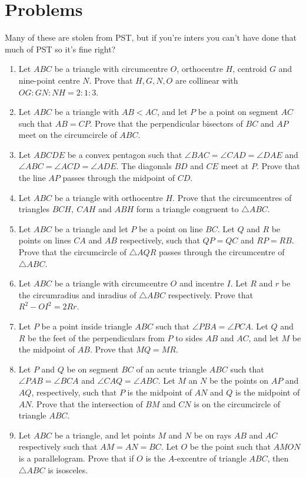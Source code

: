 \documentclass{article}
\begin{document}
\section{Problems}
Many of these are stolen from PST, but if you're inters you can't have done
that much of PST so it's fine right?
\begin{enumerate}
  \item Let $ABC$ be a triangle with circumcentre $O$, orthocentre $H$, centroid
    $G$ and nine-point centre $N$. Prove that $H,G,N,O$ are collinear with
    $OG:GN:NH=2:1:3$.
  \item Let $ABC$ be a triangle with $AB<AC$, and let $P$ be a point on segment
    $AC$ such that $AB=CP$. Prove that the perpendicular bisectors of $BC$ and
    $AP$ meet on the circumcircle of $ABC$.
  \item Let $ABCDE$ be a convex pentagon such that $\angle BAC=\angle CAD=\angle
    DAE$ and $\angle ABC=\angle ACD=\angle ADE$. The diagonals $BD$ and $CE$
    meet at $P$. Prove that the line $AP$ passes through the midpoint of $CD$.
  \item Let $ABC$ be a triangle with orthocentre $H$. Prove that the
    circumcentres of triangles $BCH,\ CAH$ and $ABH$ form a triangle congruent
    to $\triangle ABC$.
  \item Let $ABC$ be a triangle and let $P$ be a point on line $BC$. Let $Q$ and
    $R$ be points on lines $CA$ and $AB$ respectively, such that $QP=QC$ and
    $RP=RB$. Prove that the circumcircle of $\triangle AQR$ passes through the
    circumcentre of $\triangle ABC$.
  \item Let $ABC$ be a triangle with circumcentre $O$ and incentre $I$. Let $R$
    and $r$ be the circumradius and inradius of $\triangle ABC$ respectively. Prove that $R^2-OI^2=2Rr$.
  \item Let $P$ be a point inside triangle $ABC$ such that $\angle PBA=\angle
    PCA$. Let $Q$ and $R$ be the feet of
    the perpendiculars from $P$ to sides $AB$ and $AC$, and let $M$ be the
    midpoint of $AB$. Prove that $MQ=MR$.
  \item Let $P$ and $Q$ be on segment $BC$ of an acute triangle $ABC$ such that
    $\angle PAB=\angle BCA$ and $\angle CAQ=\angle ABC$. Let $M$ an $N$ be the
    points on $AP$ and $AQ$, respectively, such that $P$ is the midpoint of $AN$
    and $Q$ is the midpoint of $AN$. Prove that the intersection of $BM$ and
    $CN$ is on the circumcircle of triangle $ABC$.
  \item Let $ABC$ be a triangle, and let points $M$ and $N$ be on rays $AB$ and
    $AC$ respectively such that $AM=AN=BC$. Let $O$ be the point such that
    $AMON$ is a parallelogram. Prove that if $O$ is the $A$-excentre of triangle
    $ABC$, then $\triangle ABC$ is isosceles.
\end{enumerate}
\end{document}

